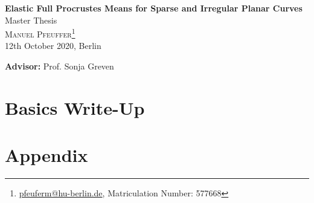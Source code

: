\documentclass[a4paper,12pt,pagesize,DIV=calc,smallheadings,english]{article}
\begin{document}
\begin{titlepage}

  \begin{center}
  {\LARGE\textbf{Elastic Full Procrustes Means for Sparse and Irregular Planar Curves}}
  \vspace{0.7cm}\\
  {\large Master Thesis}
  \vspace{0.7cm}\\
  \textsc{Manuel Pfeuffer\footnote{\url{pfeuferm@hu-berlin.de}, Matriculation Number: 577668}}
  \vspace{0.1cm}\\
  12th October 2020, Berlin
  \vspace{1cm}\\

  \vfill
  \end{center}

  \noindent \textbf{Advisor:} Prof. Sonja Greven
  \vspace{0.5em}

\end{titlepage}


\tableofcontents
\newpage


\section{Basics Write-Up}
\label{sec:intro}



\appendix
\newpage
\section{Appendix}
\label{app}



\newpage
\nocite{*}
\printbibliography[heading=bibintoc] %
\end{document}
